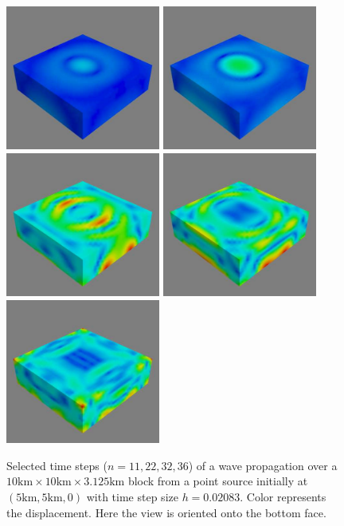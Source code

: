 \begin{figure}[t]
\begin{center}
\includegraphics[width=2in]{figures/Wave11}
\includegraphics[width=2in]{figures/Wave22}
\includegraphics[width=2in]{figures/Wave28}
\includegraphics[width=2in]{figures/Wave32}
\includegraphics[width=2in]{figures/Wave36}
\end{center}
\caption{Selected time steps ($n = 11, 22, 32, 36$) of a wave propagation over a $10\mbox{km} \times 10\mbox{km} \times 3.125\mbox{km}$ block 
from a point source initially at $(5\mbox{km},5\mbox{km},0)$
with time step size $h=0.02083$. Color represents the displacement.
Here the view is oriented onto the bottom face.
\label{WAVE FIG 2}}
\end{figure}
